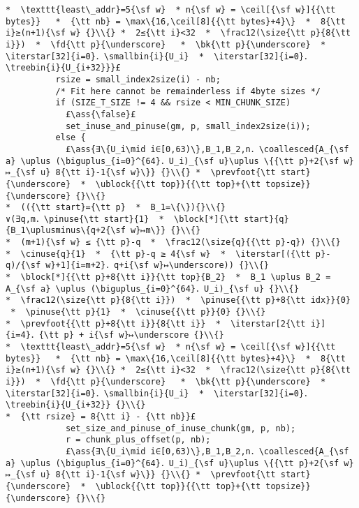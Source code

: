 \documentclass[10pt,a4paper,twoside]{report}
\makeatletter
\newcommand{\ml}[2][t]{\mbox{\mdseries\begin{tabular}[#1]{@{}L@{}}#2\end{tabular}}}
\newcommand{\ass}[1]{\ensuremath{{\color{blue}\left\{\ml[c]{#1}\right\}}}}
\renewcommand{\ceil}[2][]{\left\lceil{#2}\right\rceil_{#1}}
\newcommand{\iterstar}[2][]{\text{\LARGE $*$}^{#1}_{#2}}
\makeatother
\begin{document}
\begin{lstlisting}
*  \texttt{least\_addr}=5{\sf w}  * n{\sf w} = \ceil[{\sf w}]{{\tt bytes}}   *  {\tt nb} = \max\{16,\ceil[8]{{\tt bytes}+4}\}  *  8{\tt i}≥(n+1){\sf w} {}\\{} *  2≤{\tt i}<32  *  \frac12(\size{\tt p}{8{\tt i}})  *  \fd{\tt p}{\underscore}   *  \bk{\tt p}{\underscore}  *  \iterstar[32]{i=0}．\smallbin{i}{U_i}  *  \iterstar[32]{i=0}．\treebin{i}{U_{i+32}}}£ 
          rsize = small_index2size(i) - nb;
          /* Fit here cannot be remainderless if 4byte sizes */
          if (SIZE_T_SIZE != 4 && rsize < MIN_CHUNK_SIZE)
            £\ass{\false}£
            set_inuse_and_pinuse(gm, p, small_index2size(i));
          else {
            £\ass{∃\{U_i\mid i∈[0,63)\},B_1,B_2,n．\coallesced{A_{\sf a} \uplus (\biguplus_{i=0}^{64}．U_i)_{\sf u}\uplus \{{\tt p}+2{\sf w}↦_{\sf u} 8{\tt i}-1{\sf w}\}} {}\\{} *  \prevfoot{\tt start}{\underscore}  *  \ublock{{\tt top}}{{\tt top}+{\tt topsize}}{\underscore} {}\\{}
*  (({\tt start}={\tt p}  *  B_1=\{\}){}\\{}
∨(∃q,m．\pinuse{\tt start}{1}  *  \block[*]{\tt start}{q}{B_1\uplusminus\{q+2{\sf w}↦m\}} {}\\{}
*  (m+1){\sf w} ≤ {\tt p}-q  *  \frac12(\size{q}{{\tt p}-q}) {}\\{}
*  \cinuse{q}{1}  *  {\tt p}-q ≥ 4{\sf w}  *  \iterstar[({\tt p}-q)/{\sf w}+1]{i=m+2}．q+i{\sf w}↦\underscore)) {}\\{}
*  \block[*]{{\tt p}+8{\tt i}}{\tt top}{B_2}  *  B_1 \uplus B_2 = A_{\sf a} \uplus (\biguplus_{i=0}^{64}．U_i)_{\sf u} {}\\{}
*  \frac12(\size{\tt p}{8{\tt i}})  *  \pinuse{{\tt p}+8{\tt idx}}{0}  *  \pinuse{\tt p}{1}  *  \cinuse{{\tt p}}{0} {}\\{}
*  \prevfoot{{\tt p}+8{\tt i}}{8{\tt i}}  *  \iterstar[2{\tt i}]{i=4}．{\tt p} + i{\sf w}↦\underscore {}\\{}
*  \texttt{least\_addr}=5{\sf w}  * n{\sf w} = \ceil[{\sf w}]{{\tt bytes}}   *  {\tt nb} = \max\{16,\ceil[8]{{\tt bytes}+4}\}  *  8{\tt i}≥(n+1){\sf w} {}\\{} *  2≤{\tt i}<32  *  \frac12(\size{\tt p}{8{\tt i}})  *  \fd{\tt p}{\underscore}   *  \bk{\tt p}{\underscore}  *  \iterstar[32]{i=0}．\smallbin{i}{U_i}  *  \iterstar[32]{i=0}．\treebin{i}{U_{i+32}} {}\\{}
*  {\tt rsize} = 8{\tt i} - {\tt nb}}£ 
            set_size_and_pinuse_of_inuse_chunk(gm, p, nb);
            r = chunk_plus_offset(p, nb);
            £\ass{∃\{U_i\mid i∈[0,63)\},B_1,B_2,n．\coallesced{A_{\sf a} \uplus (\biguplus_{i=0}^{64}．U_i)_{\sf u}\uplus \{{\tt p}+2{\sf w}↦_{\sf u} 8{\tt i}-1{\sf w}\}} {}\\{} *  \prevfoot{\tt start}{\underscore}  *  \ublock{{\tt top}}{{\tt top}+{\tt topsize}}{\underscore} {}\\{}

\end{lstlisting}
\end{document}
